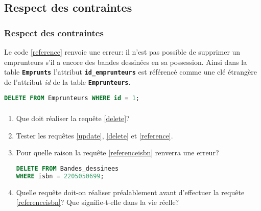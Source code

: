 \documentclass[svgnames,11pt]{beamer}
\begin{document}
\subsection{Respect des contraintes}
\begin{frame}[fragile]
    \frametitle{Respect des contraintes}

    Le code \ref{reference} renvoie une erreur: il n'est pas possible de supprimer un emprunteurs s'il a encore des bandes dessinées en sa possession. Ainsi dans la table \texttt{\textbf{Emprunts}} l'attribut \texttt{\textbf{id\_emprunteurs}} est référencé comme une clé étrangère de l'attribut \emph{id} de la table \texttt{\textbf{Emprunteurs}}.
    \begin{center}
        \begin{lstlisting}[language=SQL , basicstyle=\ttfamily\small, xleftmargin=1em, xrightmargin=-1em]
DELETE FROM Emprunteurs WHERE id = 1;
\end{lstlisting}
        \label{reference}
    \end{center}

\end{frame}
\begin{frame}[fragile]
    \frametitle{}

    \begin{activite}
        \begin{enumerate}
            \item Que doit réaliser la requête \ref{delete}?
            \item Tester les requêtes \ref{update}, \ref{delete} et \ref{reference}.
            \item Pour quelle raison la requête \ref{referenceisbn} renverra une erreur?
            \begin{center}
                \begin{lstlisting}[language=SQL , basicstyle=\ttfamily\small, xleftmargin=1em, xrightmargin=-1em]
DELETE FROM Bandes_dessinees 
WHERE isbn = 2205050699;
\end{lstlisting}
                \label{referenceisbn}
            \end{center}
            \item Quelle requête doit-on réaliser préalablement avant d'effectuer la requête \ref{referenceisbn}? Que signifie-t-elle dans la vie réelle?
        \end{enumerate}
    \end{activite}

\end{frame}
\end{document}
